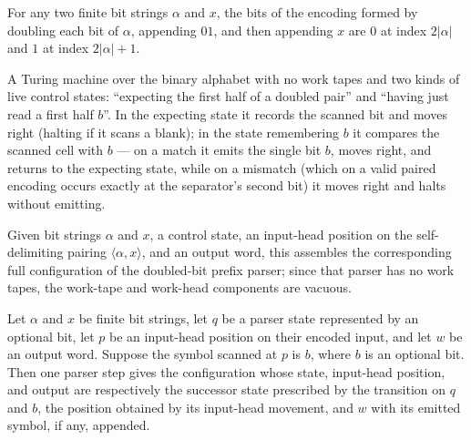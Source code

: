 \begin{lemma}
\label{Turing.universal_pair_separator}
\leanok
{}
For any two finite bit strings $\alpha$ and $x$, the bits of the encoding formed by
doubling each bit of $\alpha$, appending $01$, and then appending $x$ are $0$ at index
$2|\alpha|$ and $1$ at index $2|\alpha|+1$.
\end{lemma}

\begin{definition}
\label{Turing.universalPrefixTM}
\leanok
{}
A Turing machine over the binary alphabet with no work tapes and two kinds of
live control states: ``expecting the first half of a doubled pair'' and
``having just read a first half $b$''.  In the expecting state it records the
scanned bit and moves right (halting if it scans a blank); in the state
remembering $b$ it compares the scanned cell with $b$ --- on a match it emits
the single bit $b$, moves right, and returns to the expecting state, while on
a mismatch (which on a valid paired encoding occurs exactly at the
separator's second bit) it moves right and halts without emitting.
\end{definition}

\begin{definition}
\label{Turing.universalPrefixCfg}
\leanok
{}
Given bit strings $\alpha$ and $x$, a control state, an input-head position on
the self-delimiting pairing $\langle \alpha, x\rangle$, and an output word,
this assembles the corresponding full configuration of the doubled-bit prefix
parser; since that parser has no work tapes, the work-tape and work-head
components are vacuous.
\end{definition}

\begin{lemma}
\label{Turing.universalPrefix_step}
\leanok
{}
Let $\alpha$ and $x$ be finite bit strings, let $q$ be a parser state represented by an
optional bit, let $p$ be an input-head position on their encoded input, and let $w$ be
an output word. Suppose the symbol scanned at $p$ is $b$, where $b$ is an optional bit.
Then one parser step gives the configuration whose state, input-head position, and
output are respectively the successor state prescribed by the transition on $q$ and $b$,
the position obtained by its input-head movement, and $w$ with its emitted symbol, if
any, appended.
\end{lemma}

